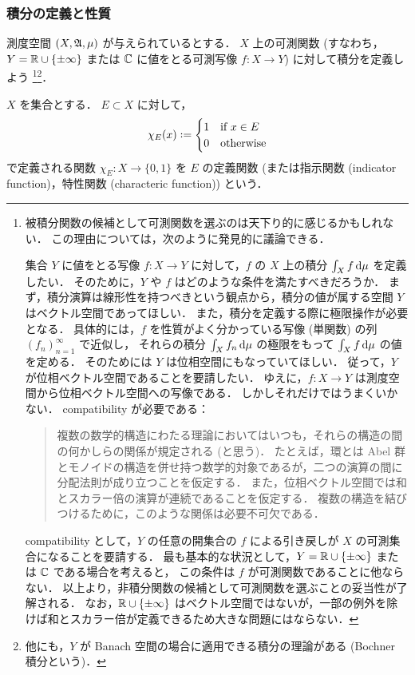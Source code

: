 \subsubsection{積分の定義と性質}

測度空間 $(X,\mathfrak{A},\mu)$ が与えられているとする．
$X$ 上の可測関数 (すなわち，$Y=\mathbb{R}\cup\{\pm\infty\}$ または $\mathbb{C}$ に値をとる可測写像 $f:X\to Y$) に対して積分を定義しよう
\footnote{
    被積分関数の候補として可測関数を選ぶのは天下り的に感じるかもしれない．
    この理由については，次のように発見的に議論できる．

    集合 $Y$ に値をとる写像 $f:X\to Y$ に対して，$f$ の $X$ 上の積分 $\int_Xf\,\mathrm{d}\mu$ を定義したい．
    そのために，$Y$ や $f$ はどのような条件を満たすべきだろうか．
    まず，積分演算は線形性を持つべきという観点から，積分の値が属する空間 $Y$ はベクトル空間であってほしい．
    また，積分を定義する際に極限操作が必要となる．
    具体的には，$f$ を性質がよく分かっている写像 (単関数) の列 $(f_n)_{n=1}^\infty$ で近似し，
    それらの積分 $\int_X f_n\,\mathrm{d}\mu$ の極限をもって $\int_Xf\,\mathrm{d}\mu$ の値を定める．
    そのためには $Y$ は位相空間にもなっていてほしい．
    従って，$Y$ が位相ベクトル空間であることを要請したい．
    ゆえに，$f:X\to Y$ は測度空間から位相ベクトル空間への写像である．
    しかしそれだけではうまくいかない．
    compatibility が必要である：
    \begin{quote}
        複数の数学的構造にわたる理論においてはいつも，それらの構造の間の何かしらの関係が規定される (と思う)．
        たとえば，環とは Abel 群とモノイドの構造を併せ持つ数学的対象であるが，二つの演算の間に分配法則が成り立つことを仮定する．
        また，位相ベクトル空間では和とスカラー倍の演算が連続であることを仮定する．
        複数の構造を結びつけるために，このような関係は必要不可欠である．
    \end{quote}
    compatibility として，$Y$ の任意の開集合の $f$ による引き戻しが $X$ の可測集合になることを要請する．
    最も基本的な状況として，$Y=\mathbb{R}\cup\{\pm\infty\}$ または $\mathbb{C}$ である場合を考えると，
    この条件は $f$ が可測関数であることに他ならない．
    以上より，非積分関数の候補として可測関数を選ぶことの妥当性が了解される．
    なお，$\mathbb{R}\cup\{\pm\infty\}$ はベクトル空間ではないが，一部の例外を除けば和とスカラー倍が定義できるため大きな問題にはならない．
}\footnote{
    他にも，$Y$ が Banach 空間の場合に適用できる積分の理論がある (Bochner 積分という)．
}．

\begin{definition}
    $X$ を集合とする．
    $E\subset X$ に対して，
    \begin{align*}
        \chi_E(x)\defeq\begin{cases}
            1&\text{if $x\in E$}\\
            0&\text{otherwise}
        \end{cases}
    \end{align*}
    で定義される関数 $\chi_E:X\to\{0,1\}$ を $E$ の定義関数
    (または指示関数 (indicator function)，特性関数 (characteric function)) という．
\end{definition}


